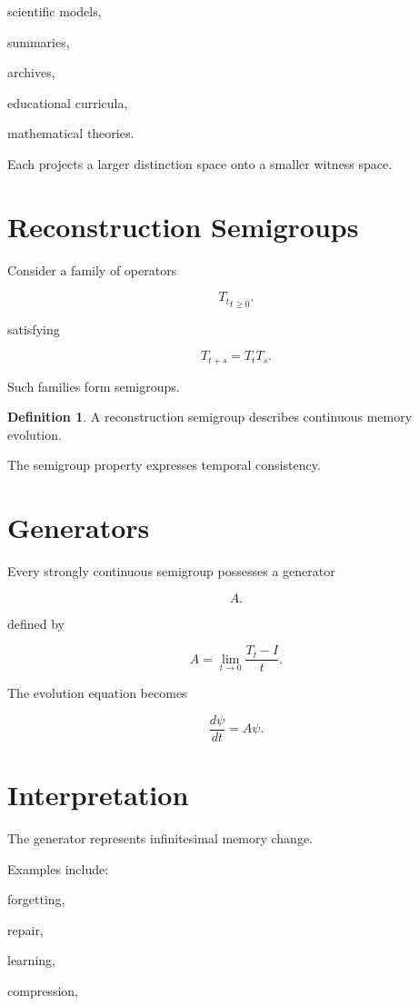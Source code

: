 \documentclass[12pt,oneside]{book}
\theoremstyle{plain} \newtheorem{theorem}{Theorem}[chapter] \newtheorem{lemma}[theorem]{Lemma} \newtheorem{proposition}[theorem]{Proposition} \newtheorem{corollary}[theorem]{Corollary}
\theoremstyle{definition} \newtheorem{definition}[theorem]{Definition} \newtheorem{axiom}[theorem]{Axiom} \newtheorem{construction}[theorem]{Construction}
\theoremstyle{remark} \newtheorem{remark}[theorem]{Remark} \newtheorem{example}[theorem]{Example}
\begin{document}
scientific models,

summaries,

archives,

educational curricula,

mathematical theories.

Each projects a larger distinction space onto a smaller witness space.

\section{Reconstruction Semigroups}

Consider a family of operators

\[
{T_t}_{t\ge0}.
\]

satisfying

\[
T_{t+s}
=
T_tT_s.
\]

Such families form semigroups.

\begin{definition}

A reconstruction semigroup describes continuous memory evolution.

\end{definition}

The semigroup property expresses temporal consistency.

\section{Generators}

Every strongly continuous semigroup possesses a generator

\[
A.
\]

defined by

\[
A
=
\lim_{t\to0}
\frac{T_t-I}{t}.
\]

The evolution equation becomes

\[
\frac{d\psi}{dt}
=
A\psi.
\]

\section{Interpretation}

The generator represents infinitesimal memory change.

Examples include:

forgetting,

repair,

learning,

compression,
\end{document}
